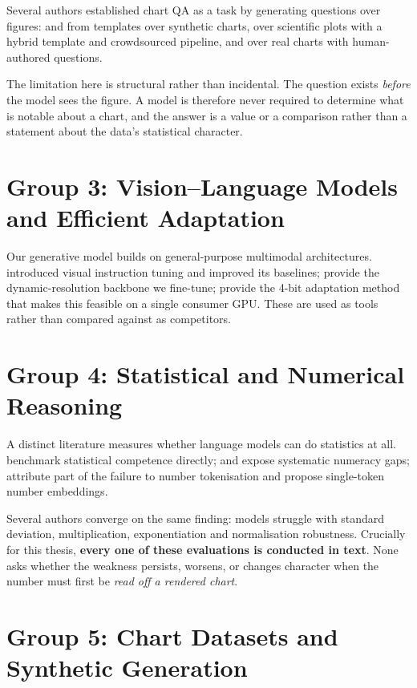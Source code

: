 Several authors established chart QA as a task by generating questions over
figures: \citet{figureqa} and \citet{dvqa} from templates over synthetic
charts, \citet{plotqa} over scientific plots with a hybrid template and
crowdsourced pipeline, and \citet{chartqa} over real charts with
human-authored questions.

The limitation here is structural rather than incidental. The question exists
\emph{before} the model sees the figure. A model is therefore never required to
determine what is notable about a chart, and the answer is a value or a
comparison rather than a statement about the data's statistical character.

\section{Group 3: Vision--Language Models and Efficient Adaptation}

Our generative model builds on general-purpose multimodal architectures.
\citet{llava} introduced visual instruction tuning and \citet{llava15} improved
its baselines; \citet{qwen2vl} provide the dynamic-resolution backbone we
fine-tune; \citet{qlora} provide the 4-bit adaptation method that makes this
feasible on a single consumer GPU. These are used as tools rather than compared
against as competitors.

\section{Group 4: Statistical and Numerical Reasoning}

A distinct literature measures whether language models can do statistics at all.
\citet{stateval} benchmark statistical competence directly; \citet{numericbench}
and \citet{numeracynli} expose systematic numeracy gaps; \citet{bittokens}
attribute part of the failure to number tokenisation and propose single-token
number embeddings.

Several authors converge on the same finding: models struggle with standard
deviation, multiplication, exponentiation and normalisation robustness. Crucially
for this thesis, \textbf{every one of these evaluations is conducted in text}.
None asks whether the weakness persists, worsens, or changes character when the
number must first be \emph{read off a rendered chart}.

\section{Group 5: Chart Datasets and Synthetic Generation}

